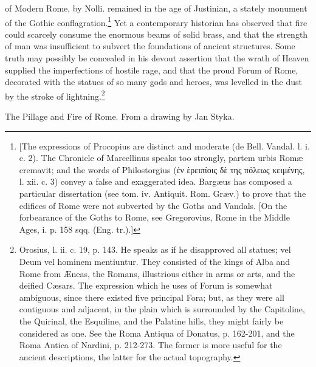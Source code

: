 {of Modern Rome, by Nolli.} remained in the age of Justinian, a stately monument of the Gothic conflagration.\footnote{[The expressions of Procopius are distinct and moderate (de Bell. Vandal. l. i. c. 2). The Chronicle of Marcellinus speaks too strongly, partem urbis Romæ cremavit; and the words of Philostorgius (\textgreek{\texthebrew{ἐ}ν \texthebrew{ὲ}ρειπίοις δ\texthebrew{ὲ} της πόλεως κειμένης}, l. xii. c. 3) convey a false and exaggerated idea. Bargæus has composed a particular dissertation (see tom. iv. Antiquit. Rom. Græv.) to prove that the edifices of Rome were not subverted by the Goths and Vandals. [On the forbearance of the Goths to Rome, see Gregorovius, Rome in the Middle Ages, i. p. 158 sqq. (Eng. tr.).]} Yet a contemporary historian has observed that fire could scarcely consume the enormous beams of solid brass, and that the strength of man was insufficient to subvert the foundations of ancient structures. Some truth may possibly be concealed in his devout assertion that the wrath of Heaven supplied the imperfections of hostile rage, and that the proud Forum of Rome, decorated with the statues of so many gods and heroes, was levelled in the dust by the stroke of lightning.\footnote{Orosius, l. ii. c. 19, p. 143. He speaks as if he disapproved all statues; vel Deum vel hominem mentiuntur. They consisted of the kings of Alba and Rome from Æneas, the Romans, illustrious either in arms or arts, and the deified Cæsars. The expression which he uses of Forum is somewhat ambiguous, since there existed five principal Fora; but, as they were all contiguous and adjacent, in the plain which is surrounded by the Capitoline, the Quirinal, the Esquiline, and the Palatine hills, they might fairly be considered as one. See the Roma Antiqua of Donatus, p. 162-201, and the Roma Antica of Nardini, p. 212-273. The former is more useful for the ancient descriptions, the latter for the actual topography.}

The Pillage and Fire of Rome. From a drawing by Jan Styka.

